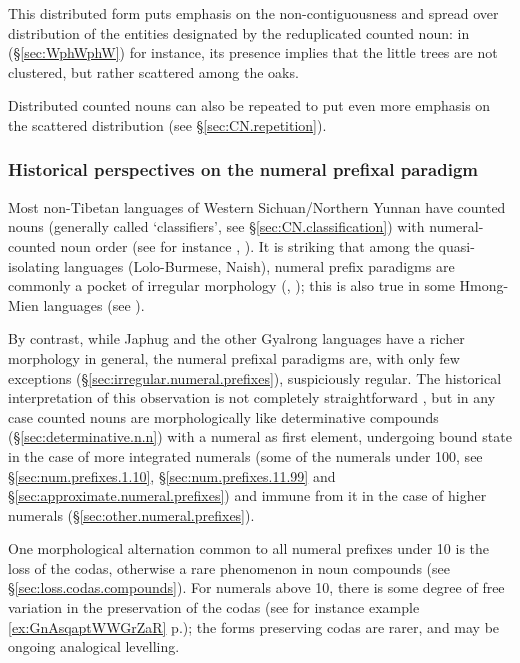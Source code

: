 This distributed form puts emphasis on the non-contiguousness and spread over distribution of the entities designated by the reduplicated counted noun: in (§\ref{sec:WphWphW}) for instance, its presence implies that the little trees are not clustered, but rather scattered among the oaks.

Distributed counted nouns can also be repeated to put even more emphasis on the scattered distribution (see §\ref{sec:CN.repetition}).

\subsubsection{Historical perspectives on the numeral prefixal paradigm} \label{sec:num.prefix.paradigm.history}
Most non-Tibetan languages of Western Sichuan/Northern Yunnan have counted nouns (generally called `classifiers', see §\ref{sec:CN.classification}) with numeral-counted noun order (see for instance \citealt{zhang14classifiers}, \citealt[163--194]{michaud17yongning}).  It is striking that among the quasi-isolating languages (Lolo-Burmese, Naish), numeral prefix paradigms are commonly a pocket of irregular morphology (\citealt{bradley05numerals}, \citealt{michaud11cl}); this is also true in some Hmong-Mien  languages (see \citealt{gerner10classifier.isolating}).

By contrast, while Japhug and the other Gyalrong languages have a richer morphology in general, the numeral prefixal paradigms are, with only few exceptions (§\ref{sec:irregular.numeral.prefixes}), suspiciously regular. The historical interpretation of this observation is not completely straightforward \citep{jacques17num}, but in any case counted nouns are morphologically like determinative compounds (§\ref{sec:determinative.n.n}) with a numeral as first element, undergoing bound state in the case of more integrated numerals (some of the numerals under 100, see §\ref{sec:num.prefixes.1.10},  §\ref{sec:num.prefixes.11.99} and §\ref{sec:approximate.numeral.prefixes}) and immune from it in the case of higher numerals (§\ref{sec:other.numeral.prefixes}).

One morphological alternation common to all numeral prefixes under 10 is the loss of the codas, otherwise a rare phenomenon in noun compounds (see §\ref{sec:loss.codas.compounds}). For numerals above 10, there is some degree of free variation in the preservation of the codas (see for instance example \ref{ex:GnAsqaptWWGrZaR} p.\pageref{ex:GnAsqaptWWGrZaR}); the forms preserving codas are rarer, and may be ongoing analogical levelling.

